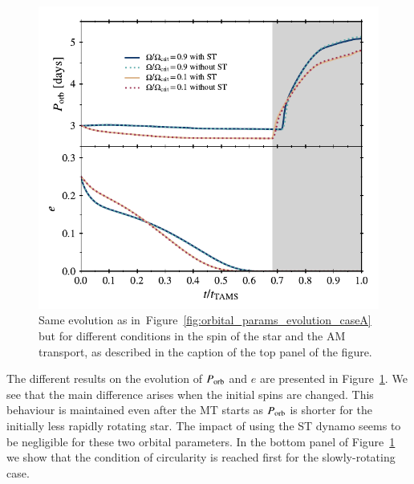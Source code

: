 \documentclass{aa}
\begin{document}
\begin{figure}
   \centering
   \includegraphics[width=\hsize]{figures/orbital_params_evolution_caseA_appendix.pdf}
   \caption{Same evolution as in~Figure~\ref{fig:orbital_params_evolution_caseA} but for different conditions in the spin of the star and
      the AM transport, as described in the caption of the top panel of the figure.}
   \label{fig:orbital_params_evolution_caseA_appendix}   
\end{figure}

The different results on the evolution of $P_{\rm orb}$ and $e$ are presented in Figure~\ref{fig:orbital_params_evolution_caseA_appendix}.
We see that the main difference arises when the initial spins are changed. This behaviour is maintained even after the MT starts as
$P_{\rm orb}$ is shorter for the initially less rapidly rotating star. The impact of using the ST dynamo seems to be negligible for these
two orbital parameters. In the bottom panel of Figure~\ref{fig:orbital_params_evolution_caseA_appendix} we show that the condition of
circularity is reached first for the slowly-rotating case.
\end{document}

